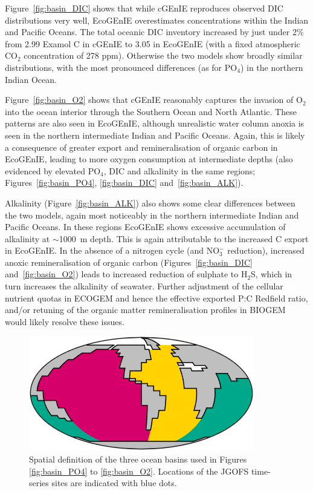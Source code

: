 \documentclass[gmd, manuscript]{copernicus}
\begin{document}
{Figure~\ref{fig:basin_DIC} shows that while cGEnIE reproduces observed DIC distributions very well, EcoGEnIE overestimates concentrations within the Indian and Pacific Oceans. The total oceanic DIC inventory increased by just under 2\% from 2.99 Examol C in cGEnIE to 3.05 in EcoGEnIE (with a fixed atmospheric CO\(_{2}\) concentration of 278 ppm). Otherwise the two models show broadly similar distributions, with the most pronounced differences (as for PO$_4$) in the northern Indian Ocean.

Figure~\ref{fig:basin_O2} shows that cGEnIE reasonably captures the invasion of O$_2$ into the ocean interior through the Southern Ocean and North Atlantic. These patterns are also seen in EcoGEnIE, although unrealistic water column anoxia is seen in the northern intermediate Indian and Pacific Oceans. Again, this is likely a consequence of greater export and remineralisation of organic carbon in EcoGEnIE, leading to more oxygen consumption at intermediate depths (also evidenced by elevated PO$_4$, DIC and alkalinity in the same regions; Figures~\ref{fig:basin_PO4}, \ref{fig:basin_DIC} and~\ref{fig:basin_ALK}).

Alkalinity (Figure~\ref{fig:basin_ALK}) also shows some clear differences between the two models, again most noticeably in the northern intermediate Indian and Pacific Oceans. In these regions EcoGEnIE shows excessive accumulation of alkalinity at $\sim$1000~m depth. This is again attributable to the increased C export in EcoGEnIE. In the absence of a nitrogen cycle (and NO\(^{-}_{3}\) reduction), increased anoxic remineralisation of organic carbon (Figures~\ref{fig:basin_DIC} and~\ref{fig:basin_O2}) leads to increased reduction of sulphate to H\(_{2}\)S, which in turn increases the alkalinity of seawater. Further adjustment of the cellular nutrient quotas in ECOGEM and hence the effective exported P:C Redfield ratio, and/or retuning of the organic matter remineralisation profiles in BIOGEM \citep{Ridgwell:2007} would likely resolve these issues.


\begin{figure}[htp]
 \centering
 \includegraphics[width=0.4\linewidth]{Final_figures/Fig_6.png}
\caption{Spatial definition of the three ocean basins used in Figures \ref{fig:basin_PO4} to \ref{fig:basin_O2}. Locations of the JGOFS time-series sites are indicated with blue dots.}
\label{fig:basins}
\end{figure}

}
\end{document}
